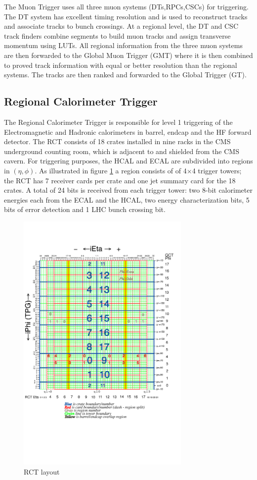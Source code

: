 The Muon Trigger uses all three muon systems (DTs,RPCs,CSCs) for triggering.
The DT system has excellent timing resolution and is used to reconstruct tracks
and associate tracks to bunch crossings. At a regional level, the DT and CSC track finders
combine segments to build muon tracks and assign transverse momentum using
LUTs. All regional information from the three muon systems are then forwarded
to the Global Muon Trigger (GMT) where it is then combined to proved track
information with equal or better resolution than the regional systems. The tracks
are then ranked and forwarded to the Global Trigger (GT).
  \subsection{Regional Calorimeter Trigger}
The Regional Calorimeter Trigger is responsible for level 1 triggering of the 
Electromagnetic and Hadronic calorimeters in barrel, endcap and the HF forward detector.
The RCT consists of 18 crates installed in nine racks in the CMS underground 
counting room, which is adjacent to and shielded from the CMS cavern.
For triggering purposes, the HCAL and ECAL are subdivided into regions in 
$(\eta,\phi)$. As illustrated in figure \ref{fig:rctTowerIetaIphi}
a region consists of of 4$\times$4 trigger towers; 
the RCT has 7 receiver cards per crate and one jet summary card for the 18 crates. 
A total of 24 bits is received from each trigger tower: 
two 8-bit calorimeter energies each from the ECAL and the HCAL,
two energy characterization bits, 5 bits of error detection and 1 LHC bunch crossing bit.
\begin{figure}[hb]
  \centering
	\includegraphics[trim = 0mm 80mm 0mm 42mm, clip, width=0.75\textwidth]{images/towers_ieta_iphi.png}
  	\caption[RCT Layout]
   	{RCT layout}
	\label{fig:rctTowerIetaIphi}
\end{figure}

